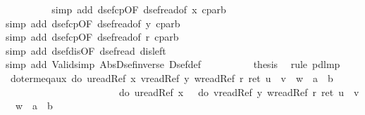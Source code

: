 \begin{isabellebody}
\ \ \ \ %
\isanewline
\ \ \ \ \isamarkupfalse%
simp\ add{\isacharcolon}\ dsef{\isacharunderscore}cp{\isacharbrackleft}OF\ dsef{\isacharunderscore}read{\isacharbrackleft}of\ {\isachardoublequote}x{\isachardoublequote}{\isacharbrackright}{\isacharbrackright}\ cp{\isacharunderscore}arb{\isacharparenright}\isanewline
\ \ \ \ \isamarkupfalse%
simp\ add{\isacharcolon}\ dsef{\isacharunderscore}cp{\isacharbrackleft}OF\ dsef{\isacharunderscore}read{\isacharbrackleft}of\ {\isachardoublequote}y{\isachardoublequote}{\isacharbrackright}{\isacharbrackright}\ cp{\isacharunderscore}arb{\isacharparenright}\isanewline
\ \ \ \ \isamarkupfalse%
simp\ add{\isacharcolon}\ dsef{\isacharunderscore}cp{\isacharbrackleft}OF\ dsef{\isacharunderscore}read{\isacharbrackleft}of\ {\isachardoublequote}r{\isachardoublequote}{\isacharbrackright}{\isacharbrackright}\ cp{\isacharunderscore}arb{\isacharparenright}\isanewline
\ \ \ \ %
\isanewline
\ \ \ \ \isamarkupfalse%
simp\ add{\isacharcolon}\ dsef{\isacharunderscore}dis{\isacharbrackleft}OF\ dsef{\isacharunderscore}read{\isacharbrackright}\ dis{\isacharunderscore}left{}{\isacharparenright}\isanewline
\ \ \ \ \isamarkupfalse%
simp\ add{\isacharcolon}\ Valid{\isacharunderscore}simp\ Abs{\isacharunderscore}Dsef{\isacharunderscore}inverse\ Dsef{\isacharunderscore}def{\isacharparenright}\isanewline
\ \ \ \ \isamarkupfalse%
\isanewline
\ \ \isamarkupfalse%
\ \isamarkupfalse%
\ {\isacharquery}thesis\ \isamarkupfalse%
\ {\isacharparenleft}rule\ pdl{\isacharunderscore}mp{\isacharparenright}\isanewline
\isamarkupfalse%
\isanewline
\isanewline
\isanewline
\isamarkupfalse%
\ doterm{\isacharunderscore}eq{}{\isacharunderscore}aux{\isacharcolon}\ {\isachardoublequote}do\ {\isacharbraceleft}u{\isasymleftarrow}readRef\ x{\isacharsemicolon}\ v{\isasymleftarrow}readRef\ y{\isacharsemicolon}\ w{\isasymleftarrow}readRef\ r{\isacharsemicolon}\ ret\ {\isacharparenleft}u\ {\isacharasterisk}\ v\ {\isacharplus}\ w\ {\isacharequal}\ a\ {\isacharasterisk}\ b{\isacharparenright}{\isacharbraceright}\ {\isacharequal}\isanewline
\ \ \ \ \ \ \ \ \ \ \ \ \ \ \ \ \ \ \ \ \ \ \ do\ {\isacharbraceleft}u{\isasymleftarrow}readRef\ x{\isacharsemicolon}\ {\isasymDown}\ {\isacharparenleft}{\isasymUp}\ {\isacharparenleft}do\ {\isacharbraceleft}v{\isasymleftarrow}readRef\ y{\isacharsemicolon}\ w{\isasymleftarrow}readRef\ r{\isacharsemicolon}\ ret\ {\isacharparenleft}u\ {\isacharasterisk}\ v\ {\isacharplus}\ w\ {\isacharequal}\ a\ {\isacharasterisk}\ b{\isacharparenright}{\isacharbraceright}{\isacharparenright}{\isacharparenright}{\isacharbraceright}{\isachardoublequote}\isamarkupfalse%

\end{isabellebody}
